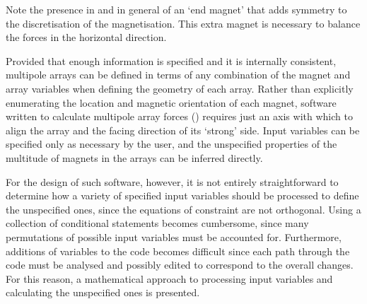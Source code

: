 \documentclass[11pt,a4paper]{memoir}
\begin{document}
Note the presence in  and in general of an `end magnet' that adds symmetry to the discretisation of the magnetisation. This extra magnet is necessary to balance the forces in the horizontal direction.

Provided that enough information is specified and it is internally consistent, multipole arrays can be defined in terms of any combination of the magnet and array variables when defining the geometry of each array.
Rather than explicitly enumerating the location and magnetic orientation of each magnet, software written to calculate multipole array forces () requires just an axis with which to align the array and the facing direction of its `strong' side.
Input variables can be specified only as necessary by the user, and the unspecified properties of the multitude of magnets in the arrays can be inferred directly.

For the design of such software, however, it is not entirely straightforward to determine how a variety of specified input variables should be processed to define the unspecified ones, since the equations of constraint are not orthogonal.
Using a collection of conditional statements becomes cumbersome, since many permutations of possible input variables must be accounted for.
Furthermore, additions of variables to the code becomes difficult since each path through the code must be analysed and possibly edited to correspond to the overall changes.
For this reason, a mathematical approach to processing input variables and calculating the unspecified ones is presented.
\end{document}
